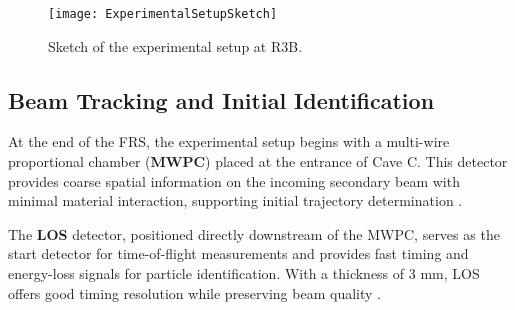 
\begin{newpdflayout}{210mm}{297mm}%
	
	\begin{figure}
		\texttt{[image: ExperimentalSetupSketch]}
		\caption[Experimental setup at R$^3$B]{Sketch of the experimental setup at \gls{R3B}.}
		\label{fig:ExperimentalSetupSketch}
	\end{figure}
	
\end{newpdflayout}
















\subsection{Beam Tracking and Initial Identification}

At the end of the \gls{FRS}, the experimental setup begins with a multi-wire proportional chamber (\textbf{MWPC}) placed at the entrance of Cave C. This detector provides coarse spatial information on the incoming secondary beam with minimal material interaction, supporting initial trajectory determination \cite{paschalis_-beam_2015}.

The \textbf{LOS} detector, positioned directly downstream of the MWPC, serves as the start detector for time-of-flight measurements and provides fast timing and energy-loss signals for particle identification. With a thickness of 3 mm, LOS offers good timing resolution while preserving beam quality \cite{panin2024neutron}.

